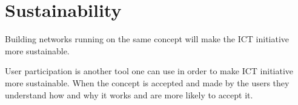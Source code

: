 \section{Sustainability}
\cite{jbemss:noa}

Building networks running on the same concept will make the ICT initiative more sustainable. 

User participation is another tool one can use in order to make ICT initiative more sustainable.
When the concept is accepted and made by the users they understand how and why it works and are more likely to accept it.
